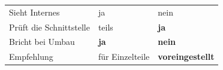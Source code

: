 \begin{merksatz}
\begin{warnung}
\begin{center}
\renewcommand{\arraystretch}{1.5}
\begin{tabular}{@{}P{2.6cm}P{2.6cm}P{3.0cm}@{}}
\toprule
&  & \\
\midrule
Sieht Internes & \textcolor{gruen}{ja} & \textcolor{akzent}{nein}\\
Prüft die Schnittstelle & \textcolor{mittel}{teils} & \textcolor{gruen}{\textbf{ja}}\\
Bricht bei Umbau & \textcolor{akzent}{\textbf{ja}} & \textcolor{gruen}{\textbf{nein}}\\
Empfehlung & für Einzelteile & \textcolor{gruen}{\textbf{voreingestellt}}\\
\bottomrule
\end{tabular}
\end{center}

\begin{center}
\begin{minipage}{0.88\textwidth}
\end{minipage}
\end{center}
\end{warnung}
\end{merksatz}

